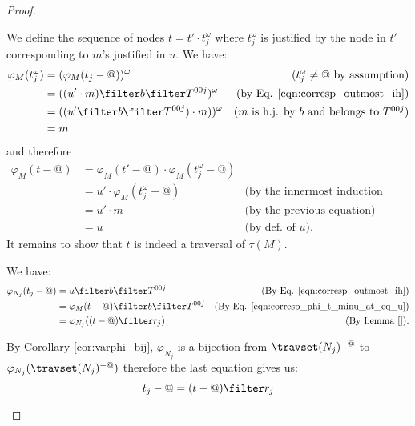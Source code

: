 \begin{proof}
\begin{enumerate}[$\bullet$]
\begin{enumerate}
\begin{enumerate}[-]
        We define the sequence of nodes $t = t'\cdot t_j^\omega$
        where $t_j^\omega$ is justified by the node in $t'$ corresponding
        to $m$'s justified in $u$. We have:
        \begin{align*}
            \varphi_M (t_j^\omega) &= (\varphi_M (t_j-@))^\omega & \mbox{($t_j^\omega \neq @$ by assumption)}\\
                                   &= ((u' \cdot m) \filter b\filter T^{00j})^\omega & \mbox{(by Eq. \ref{eqn:corresp_outmost_ih})}\\
                                   &= ((u' \filter b\filter T^{00j}) \cdot m))^\omega & \mbox{($m$ is h.j. by $b$ and belongs to $T^{00j}$)}\\
                                   &= m
        \end{align*}
        and therefore
        \begin{align}
          \varphi_{M}(t-@)  &=  \varphi_{M}(t'-@)  \cdot \varphi_{M}(t_j^\omega-@) \nonumber \\
                &=   u' \cdot \varphi_{M}(t_j^\omega-@) & \mbox{(by the innermost induction hypothesis)} \nonumber \\
                &=   u' \cdot m & \mbox{(by the previous equation)} \nonumber \\
                &=   u & \mbox{(by def. of $u$).} \label{eqn:corresp_phi_t_minu_at_eq_u}
        \end{align}
        It remains to show that $t$ is indeed a traversal of $\tau(M)$.
        
        We have:
        \begin{align*}         
        \varphi_{N_j}(t_j-@) &= u \filter b \filter T^{00j} 
            & \mbox{(By Eq. \ref{eqn:corresp_outmost_ih})} \\
         &= \varphi_{M}(t-@) \filter b \filter T^{00j}
            & \mbox{(By Eq. \ref{eqn:corresp_phi_t_minu_at_eq_u})} \\
         &= \varphi_{N_j}((t-@) \filter r_j )
            & \mbox{(By Lemma \ref{}).}
        \end{align*}
          
        By Corollary \ref{cor:varphi_bij}, $\varphi_{N_j}$ is a bijection from $\travset(N_j)^{-@}$ to
        $\varphi_{N_j}( \travset(N_j)^{-@})$ therefore the last equation gives us:
         $$t_j-@ = (t-@) \filter r_j $$


\end{enumerate}
\end{enumerate}
\end{enumerate}
\end{proof}
